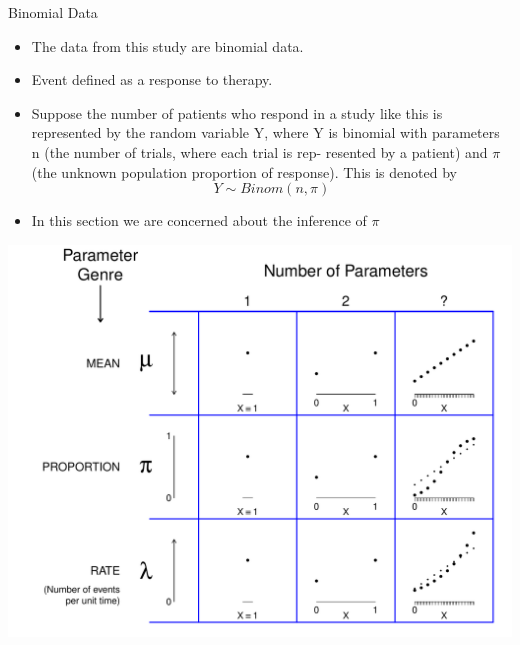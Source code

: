 \documentclass[10pt]{beamer}\usepackage[]{graphicx}\usepackage[]{color}
\makeatletter
\def\maxwidth{ %
  \ifdim\Gin@nat@width>\linewidth
    \linewidth
  \else
    \Gin@nat@width
  \fi
}
\newenvironment{knitrout}{}{} %
\makeatother
\begin{document}
\begin{frame}{Binomial Data}
\begin{itemize}
	\item The data from this study are binomial data. 
	\item Event defined as a response to therapy.
	\item Suppose the number of patients who respond in a study like this is represented by the random
	variable Y, where Y is binomial with parameters n (the number of trials, where each trial is rep-
	resented by a patient) and $\pi$ (the unknown population proportion of response). This is denoted by $$Y\sim Binom(n,\pi)$$
	\item In this section we are concerned about the inference of $\pi$
\end{itemize}
\end{frame}



\begin{frame}
\begin{knitrout}\tiny
{}\color{fgcolor}

{\centering \includegraphics[width=\maxwidth]{figure/unnamed-chunk-2-1} 

}


\end{knitrout}
\end{frame}
\end{document}
